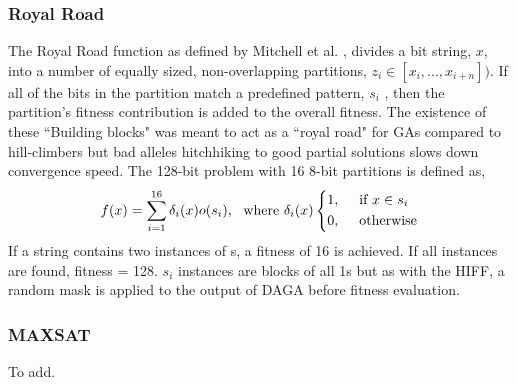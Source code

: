 \documentclass[twoside]{article}
\begin{document}
\subsubsection{Royal Road}
The Royal Road function as defined by Mitchell et al. \cite{mitchell}, divides a bit string, \(x\), into a number of equally sized, non-overlapping partitions, \(z_i\in[x_i, ..., x_{i+n}])\). If all of the bits in the partition match a predefined pattern, \(s_i\) , then the partition's fitness contribution is added to the overall fitness. The existence of these ``Building blocks" was meant to act as a ``royal road" for GAs compared to hill-climbers but bad alleles hitchhiking to good partial solutions slows down convergence speed. The 128-bit problem with 16 8-bit partitions is defined as,
\\
\[
f(x)= \sum_{i=1}^{16} \delta_i(x)o(s_i), \text{\ \ where\ } \delta_i(x) \begin{dcases*}
1, \text{\ \ \ \ if } x\in s_i\\
0, \text{\ \ \ \ otherwise}
\end{dcases*}
\]
If a string contains two instances of s, a fitness of 16 is achieved. If all instances are found, fitness = 128. \(s_i\) instances are blocks of all 1s but as with the HIFF, a random mask is applied to the output of DAGA before fitness evaluation.
\subsubsection{MAXSAT}
To add.
\end{document}
